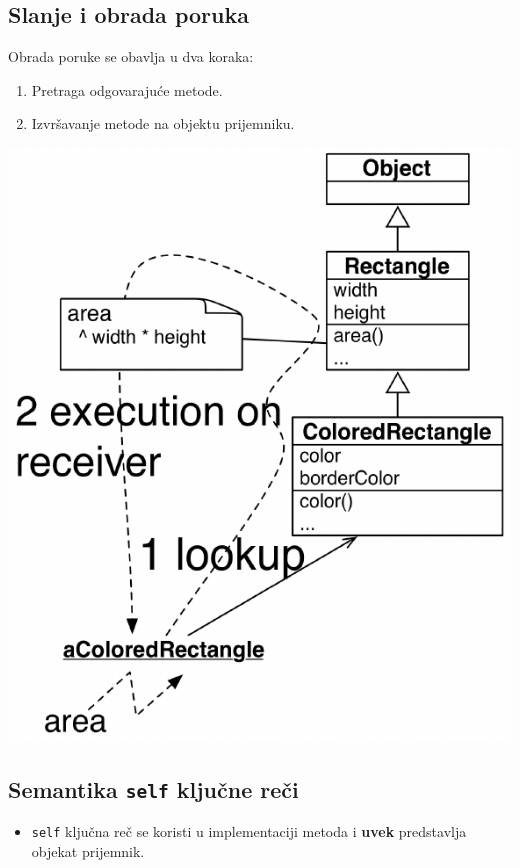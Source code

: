 \documentclass[presentation]{beamer}
\begin{document}
\subsection{Slanje i obrada poruka}
\label{sec:orgfbb81d3}

Obrada poruke se obavlja u dva koraka:
\begin{enumerate}
\item Pretraga odgovarajuće metode.
\item Izvršavanje metode na objektu prijemniku.
\end{enumerate}
\begin{center}
\includegraphics[width=.9\linewidth]{./slike/message_sending.png}
\end{center}

\subsection{Semantika \texttt{self} ključne reči}
\label{sec:org85c16e3}

\begin{itemize}
\item \texttt{self} ključna reč se koristi u implementaciji metoda i \textbf{uvek} predstavlja
objekat prijemnik.
\end{itemize}
\end{document}
